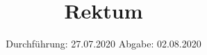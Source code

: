 

\subject{TPS Praktikum}
\title{Rektum}
\date{%
  Durchführung: 27.07.2020
  \hspace{3em}
  Abgabe: 02.08.2020
}



\maketitle
\thispagestyle{empty}
\tableofcontents
\newpage






\printbibliography{}



